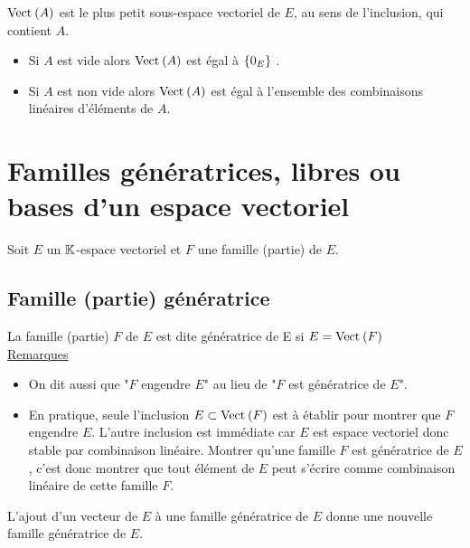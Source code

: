 \begin{defprop}[Caractérisation]
    \(\Vect{A}\) est le plus petit sous-espace vectoriel de \(E\), au sens de l’inclusion, qui contient \(A\).
\end{defprop}

\begin{theo}
    \begin{itemize}
        \item Si \(A\) est vide alors \(\Vect{A}\) est égal à \(\left\lbrace0_E \right\rbrace\) .
        \item Si \(A\) est non vide alors \(\Vect{A}\) est égal à l’ensemble des combinaisons linéaires d’éléments de \(A\).
    \end{itemize}
\end{theo}

\section{Familles génératrices, libres ou bases d’un espace vectoriel}
    Soit \(E\) un \(\mathbb{K}\)-espace vectoriel et \(F\) une famille (partie) de \(E\).
\subsection{Famille (partie) génératrice}
\begin{defi}
    La famille (partie) \(F\) de \(E\) est dite génératrice de E si \(E = \Vect{F}\)\\
    \underline{Remarques}\\
    \begin{itemize}
        \item On dit aussi que "\(F\) engendre \(E\)" au lieu de "\(F\) est génératrice de \(E\)".
        \item En pratique, seule l’inclusion \(E \subset \Vect{F}\) est à établir pour montrer que \(F\) engendre \(E\). L’autre inclusion est immédiate car \(E\) est espace vectoriel donc stable par combinaison linéaire. Montrer qu’une famille \(F\) est génératrice de \(E\), c’est donc montrer que tout élément de \(E\) peut s’écrire comme combinaison linéaire de cette famille \(F\).
    \end{itemize}
\end{defi}

\begin{prop}
    L’ajout d’un vecteur de \(E\) à une famille génératrice de \(E\) donne une nouvelle famille génératrice de \(E\).
\end{prop}
